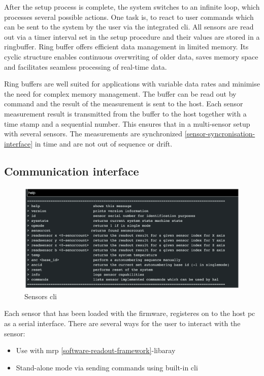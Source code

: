 After the setup process is complete, the system switches to an infinite
loop, which processes several possible actions. One task is, to react to
user commands which can be sent to the system by the user via the
integrated \gls{cli}. All sensors are read out via a timer interval set
in the setup procedure and their values are stored in a ringbuffer. Ring
buffer offers efficient data management in limited memory. Its cyclic
structure enables continuous overwriting of older data, saves memory
space and facilitates seamless processing of real-time data.

Ring buffers are well suited for applications with variable data rates
and minimise the need for complex memory management. The buffer can be
read out by command and the result of the measurement is sent to the
host. Each sensor measurement result is transmitted from the buffer to
the host together with a time stamp and a sequential number. This
ensures that in a multi-sensor setup with several sensors. The
measurements are synchronized \ref{sensor-syncronisation-interface} in
time and are not out of sequence or drift.

\hypertarget{communication-interface}{%
\subsection{Communication interface}\label{communication-interface}}

\begin{figure}
\centering
\includegraphics{./generated_images/border_Sensors_(+cli).png}
\caption{Sensors \gls{cli} \label{Sensors_(+cli).png}}
\end{figure}

Each sensor that has been loaded with the firmware, registeres on to the
host \gls{pc} as a serial interface. There are several ways for the user
to interact with the sensor:

\begin{itemize}
\tightlist
\item
  Use with \gls{mrp} \ref{software-readout-framework}-libaray
\item
  Stand-alone mode via sending commands using built-in \gls{cli}
\end{itemize}

